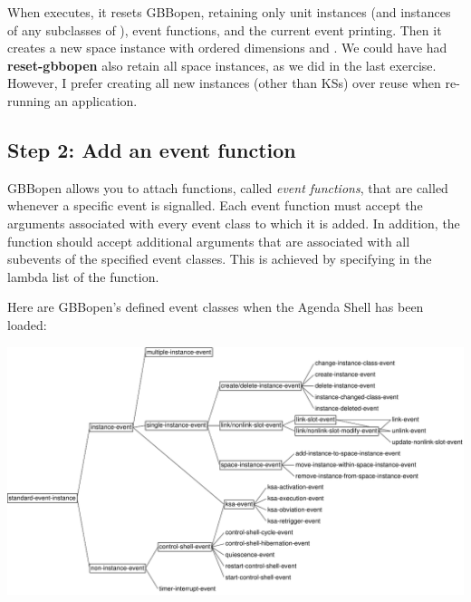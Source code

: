 \documentclass[10pt,twoside,english,pdftex]{article}
\begin{document}
When  executes, it resets GBBopen, retaining
only  unit instances (and instances of any subclasses of
), event functions, and the current event printing.  Then it
creates a new  space instance with ordered
dimensions  and .  We could have had
\textbf{reset-gbbopen} also retain all space instances, as we did in
the last exercise.  However, I prefer creating all new instances
(other than KSs) over reuse when re-running an application.

\subsection*{Step 2: Add an event function}

GBBopen allows you to attach functions, called \textit{event
  functions}, that are called whenever a specific event is signalled.
Each event function must accept the arguments associated with every
event class to which it is added. In addition, the function should
accept additional arguments that are associated with all subevents of
the specified event classes. This is achieved by specifying
 in the lambda list of the function.

Here are GBBopen's defined event classes when the Agenda Shell has
been loaded:

\T\begin{ifhtml}
\T\end{ifhtml}
\W\begin{iftex} 
\begin{center}
\includegraphics[scale=0.85]{agenda-shell-events}
\end{center}
\W\end{iftex}
\end{document}
